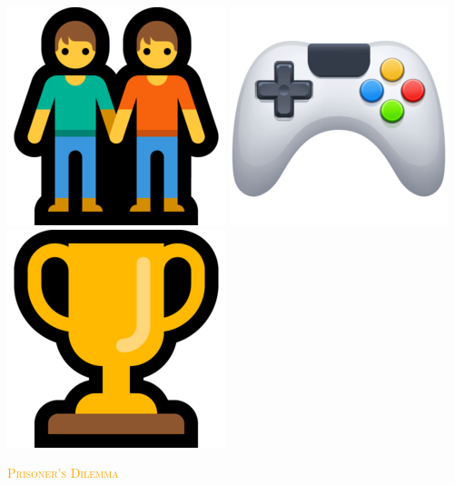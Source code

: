 \documentclass{beamer}
\begin{document}
\begin{frame}
    \centering
    \includegraphics[width=.2\textwidth]{static/players} \hspace{.6cm}
    \includegraphics[width=.2\textwidth]{static/actions} \hspace{.6cm}
    \includegraphics[width=.2\textwidth]{static/objective}
\end{frame}

\begin{frame}
    \begin{center}
    
    \end{center}
\end{frame}

\begin{frame}
    \begin{center}
    
    \end{center}
\end{frame}

\begin{frame}
    \begin{center}
    
    \end{center}
\end{frame}


\begin{frame}
    \begin{center}
        \Large
        \textcolor{orange}{\textsc{Prisoner's Dilemma}} \\ \vspace{3pt}
    \end{center}
\end{frame}
\end{document}
